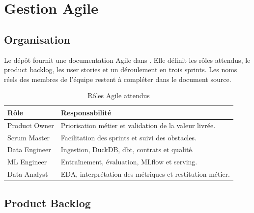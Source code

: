 \chapter{Gestion Agile}

\section{Organisation}

Le dépôt fournit une documentation Agile dans . Elle définit les rôles attendus, le product backlog, les user stories et un déroulement en trois sprints. Les noms réels des membres de l'équipe restent à compléter dans le document source.

\begin{table}[htbp]
\centering
\caption{Rôles Agile attendus}
\begin{tabular}{ll}
\toprule
Rôle & Responsabilité\\
\midrule
Product Owner & Priorisation métier et validation de la valeur livrée.\\
Scrum Master & Facilitation des sprints et suivi des obstacles.\\
Data Engineer & Ingestion, DuckDB, dbt, contrats et qualité.\\
ML Engineer & Entraînement, évaluation, MLflow et serving.\\
Data Analyst & EDA, interprétation des métriques et restitution métier.\\
\bottomrule
\end{tabular}
\end{table}

\section{Product Backlog}

